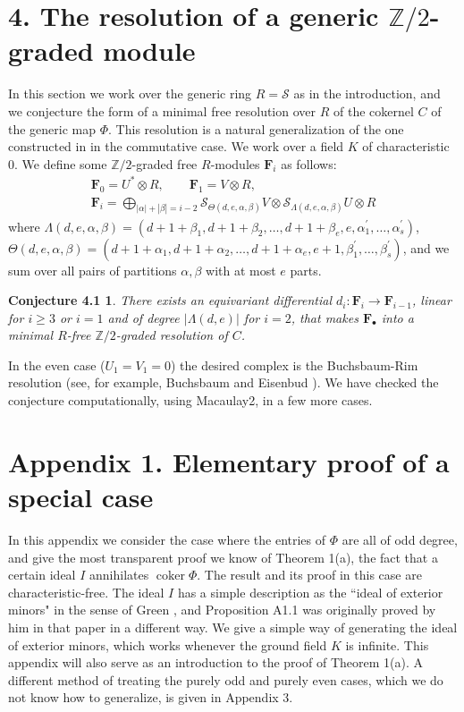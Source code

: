 \documentclass{tran-l}
\theoremstyle{plain}
\newtheorem*{theorem17}{Conjecture 4.1}
\theoremstyle{remark}
\theoremstyle{definition}
\newcommand{\myS}{{\mathcal S}}
\newcommand{\FF}{{\mathbf F}}
\newcommand{\coker}{\operatorname{coker}}
\newcommand{\ZZ}{\mathbb {Z}}
\begin{document}
\section*{4. The resolution of a generic $\mathbb{Z}/2$-graded module}

In this section we work over the generic ring $R=\myS $ as in the
introduction, and we conjecture the form of a
minimal free resolution over $R$ of the cokernel $C$ of the
generic map $\Phi $. This
resolution is a natural generalization of the one constructed in \cite{BE} in
the commutative case. We work over a field $K$
of characteristic $0$. We define some
$\ZZ /2$-graded free $R$-modules $\FF _{i}$ as follows:
\begin{gather*}
{\FF }_{0} = U^{*}\otimes R,\qquad {\FF }_{1} = V\otimes R,\\
{\FF }_{i} =\bigoplus _{|\alpha |+|\beta | = i-2}  \myS
_{\Theta (d,e,\alpha ,\beta )}V\otimes \myS _{\Lambda (d,e,\alpha ,\beta
)}U\otimes R 
\end{gather*}
where $\Lambda (d,e,\alpha ,\beta ) = (d+1+\beta _{1} ,d+1+\beta _{2},\ldots ,
d+1+\beta _{e} ,e,\alpha ^{\prime }_{1} ,\ldots ,\alpha ^{\prime }_{s} )$,
$\Theta (d,e,\alpha ,\beta )= (d+1+\alpha _{1} ,d+1+\alpha _{2},\ldots,
d+1+\alpha _{e} ,e+1,\beta ^{\prime }_{1} ,\ldots ,\beta ^{\prime }_{s} )$, and
we sum over all pairs of partitions $\alpha ,\beta $ with at most $e$ parts.

\begin{theorem17} There exists an equivariant differential $d_{i} :{\FF
}_{i}\rightarrow {\FF }_{i-1}$, linear for $i\ge 3$ or $i=1$ and of degree
$|\Lambda (d,e)|$ for $i=2$, that makes ${\FF }_{\bullet }$ into a minimal
$R$-free $\ZZ /2$-graded resolution of $C$. \end{theorem17}

In the even case ($U_{1}=V_{1}=0$) the desired complex is the Buchsbaum-Rim
resolution (see, for example, Buchsbaum and Eisenbud \cite{BE}). We have
checked the conjecture computationally, using Macaulay2, in a few more cases.

\section*{Appendix 1. Elementary proof of a special case}

In this appendix we consider the case where the entries of  $\Phi $ are all of
odd degree, and  give the most transparent proof we know of Theorem 1(a), the
fact that a certain ideal $I$ annihilates $\coker \Phi $. The result and its
proof in this case are characteristic-free. The ideal $I$ has a simple
description as the ``ideal of exterior minors" in the sense of Green
\cite{Gre}, and Proposition A1.1 was originally proved by him in that paper in
a different way. We give a simple way of generating the ideal of exterior
minors, which works whenever the ground field $K$ is infinite. This appendix
will also serve as an introduction to the proof of Theorem 1(a). A different
method of treating the purely odd and purely even cases, which we do not know
how to generalize, is given in Appendix 3.
\end{document}

